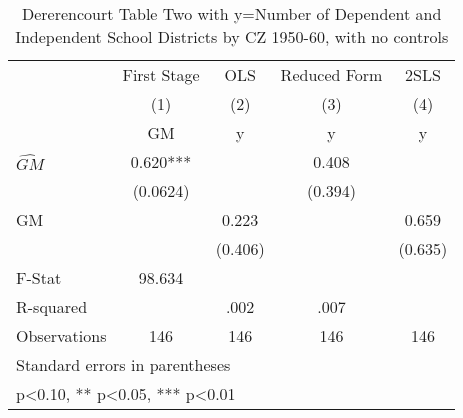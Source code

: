 \begin{table}[htbp]\centering
\def\sym#1{\ifmmode^{#1}\else\(^{#1}\)\fi}
\caption{Dererencourt Table Two with y=Number of Dependent and Independent School Districts by CZ 1950-60, with no controls}
\begin{tabular}{l*{4}{c}}
\toprule
                    & First Stage   &         OLS   &Reduced Form   &        2SLS   \\
                    &\multicolumn{1}{c}{(1)}&\multicolumn{1}{c}{(2)}&\multicolumn{1}{c}{(3)}&\multicolumn{1}{c}{(4)}\\
                    &\multicolumn{1}{c}{GM}&\multicolumn{1}{c}{y}&\multicolumn{1}{c}{y}&\multicolumn{1}{c}{y}\\
\midrule
$\hat{GM}$          &       0.620***&               &       0.408   &               \\
                    &    (0.0624)   &               &     (0.394)   &               \\
\addlinespace
GM                  &               &       0.223   &               &       0.659   \\
                    &               &     (0.406)   &               &     (0.635)   \\
\midrule
F-Stat              &      98.634   &               &               &               \\
R-squared           &               &        .002   &        .007   &               \\
Observations        &         146   &         146   &         146   &         146   \\
\bottomrule
\multicolumn{5}{l}{\footnotesize Standard errors in parentheses}\\
\multicolumn{5}{l}{\footnotesize * p<0.10, ** p<0.05, *** p<0.01}\\
\end{tabular}
\end{table}
